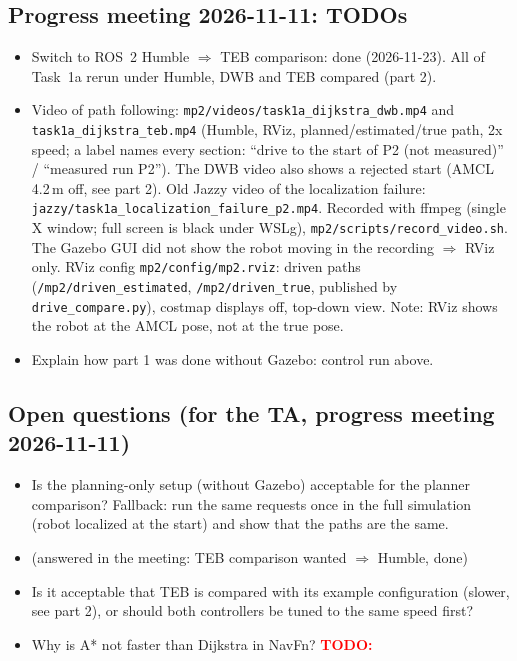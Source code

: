 \documentclass[10pt]{article}
\newcommand{\todo}[1]{\textcolor{red}{\textbf{TODO:} #1}}
\newcommand{\pkg}[1]{\texttt{#1}}
\begin{document}
\subsection{Progress meeting 2026-11-11: TODOs}
\begin{itemize}
  \item Switch to ROS~2 Humble $\Rightarrow$ TEB comparison: done (2026-11-23). All of Task~1a rerun under Humble,
        DWB and TEB compared (part 2).
  \item Video of path following: \pkg{mp2/videos/task1a\_dijkstra\_dwb.mp4} and \pkg{task1a\_dijkstra\_teb.mp4} (Humble,
        RViz, planned/estimated/true path, 2x speed; a label names every section: ``drive to the start of P2 (not
        measured)'' / ``measured run P2''). The DWB video also shows a rejected start (AMCL 4.2\,m off, see part 2).
        Old Jazzy video of the localization failure: \pkg{jazzy/task1a\_localization\_failure\_p2.mp4}.
        Recorded with ffmpeg (single X window; full screen is black under WSLg), \pkg{mp2/scripts/record\_video.sh}.
        The Gazebo GUI did not show the robot moving in the recording $\Rightarrow$ RViz only.
        RViz config \pkg{mp2/config/mp2.rviz}: driven paths (\pkg{/mp2/driven\_estimated}, \pkg{/mp2/driven\_true},
        published by \pkg{drive\_compare.py}), costmap displays off, top-down view. Note: RViz shows the robot at the
        AMCL pose, not at the true pose.
  \item Explain how part 1 was done without Gazebo: control run above.
\end{itemize}

\subsection{Open questions (for the TA, progress meeting 2026-11-11)}
\begin{itemize}
  \item Is the planning-only setup (without Gazebo) acceptable for the planner comparison?
        Fallback: run the same requests once in the full simulation (robot localized at the start)
        and show that the paths are the same.
  \item (answered in the meeting: TEB comparison wanted $\Rightarrow$ Humble, done)
  \item Is it acceptable that TEB is compared with its example configuration (slower, see part 2), or should both
        controllers be tuned to the same speed first?
  \item Why is A* not faster than Dijkstra in NavFn? \todo{}
\end{itemize}
\end{document}
